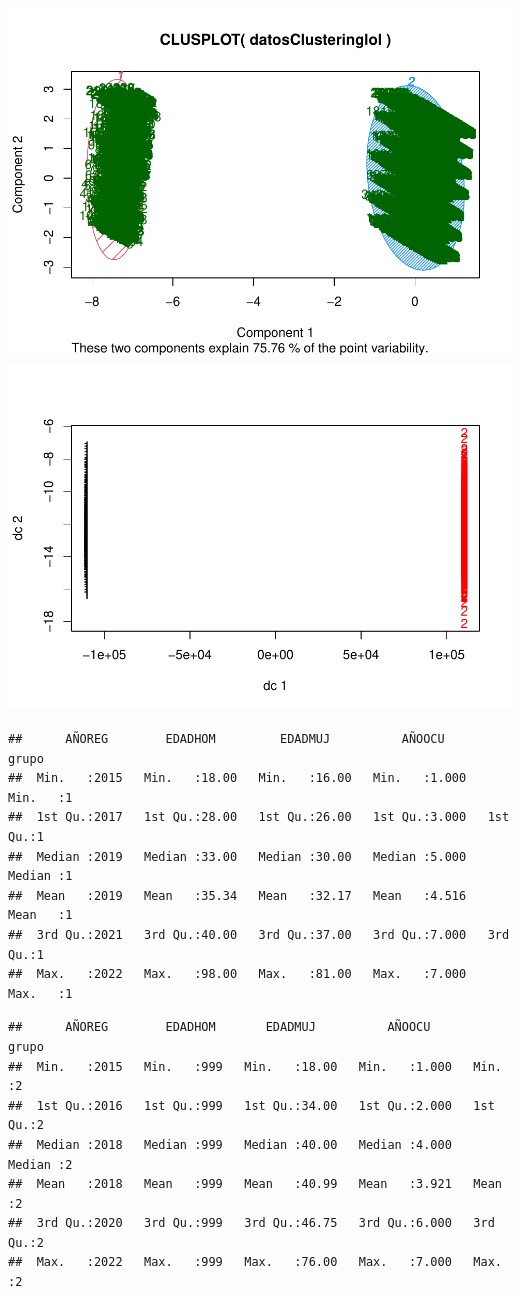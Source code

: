 \documentclass[
]{article}
\begin{document}
\includegraphics{Proyecto_files/figure-latex/fuzzy2-1.pdf}
\includegraphics{Proyecto_files/figure-latex/fuzzy2-2.pdf}

\begin{verbatim}
##      AÑOREG        EDADHOM         EDADMUJ          AÑOOCU          grupo  
##  Min.   :2015   Min.   :18.00   Min.   :16.00   Min.   :1.000   Min.   :1  
##  1st Qu.:2017   1st Qu.:28.00   1st Qu.:26.00   1st Qu.:3.000   1st Qu.:1  
##  Median :2019   Median :33.00   Median :30.00   Median :5.000   Median :1  
##  Mean   :2019   Mean   :35.34   Mean   :32.17   Mean   :4.516   Mean   :1  
##  3rd Qu.:2021   3rd Qu.:40.00   3rd Qu.:37.00   3rd Qu.:7.000   3rd Qu.:1  
##  Max.   :2022   Max.   :98.00   Max.   :81.00   Max.   :7.000   Max.   :1
\end{verbatim}

\begin{verbatim}
##      AÑOREG        EDADHOM       EDADMUJ          AÑOOCU          grupo  
##  Min.   :2015   Min.   :999   Min.   :18.00   Min.   :1.000   Min.   :2  
##  1st Qu.:2016   1st Qu.:999   1st Qu.:34.00   1st Qu.:2.000   1st Qu.:2  
##  Median :2018   Median :999   Median :40.00   Median :4.000   Median :2  
##  Mean   :2018   Mean   :999   Mean   :40.99   Mean   :3.921   Mean   :2  
##  3rd Qu.:2020   3rd Qu.:999   3rd Qu.:46.75   3rd Qu.:6.000   3rd Qu.:2  
##  Max.   :2022   Max.   :999   Max.   :76.00   Max.   :7.000   Max.   :2
\end{verbatim}
\end{document}
